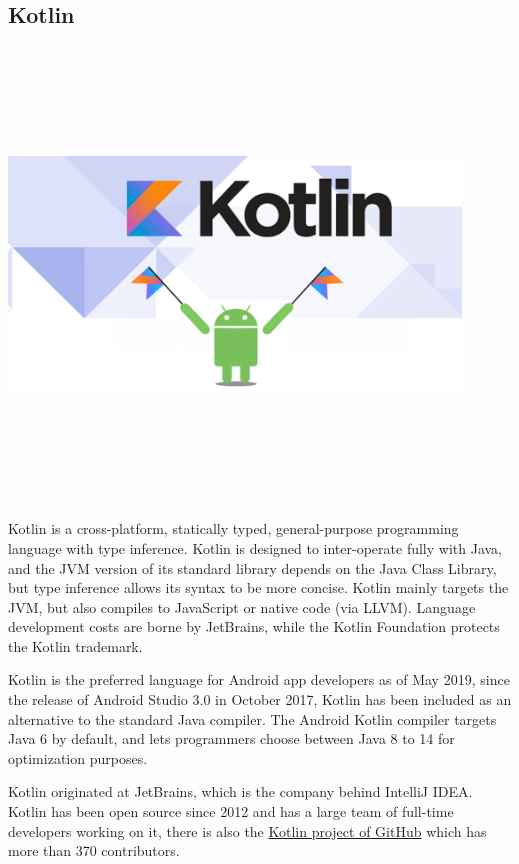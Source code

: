\subsection{Kotlin}
\par
\medskip
\begin{center}
    \includegraphics[width=12cm,height=12cm,keepaspectratio]{Images/Kotlin.png}
\end{center}
Kotlin is a cross-platform, statically typed, general-purpose programming language with type inference. Kotlin is designed to inter-operate fully with Java, and the JVM version of its standard library depends on the Java Class Library, but type inference allows its syntax to be more concise. Kotlin mainly targets the JVM, but also compiles to JavaScript or native code (via LLVM). Language development costs are borne by JetBrains, while the Kotlin Foundation protects the Kotlin trademark.

Kotlin is the preferred language for Android app developers as of May 2019, since the release of Android Studio 3.0 in October 2017, Kotlin has been included as an alternative to the standard Java compiler. The Android Kotlin compiler targets Java 6 by default, and lets programmers choose between Java 8 to 14 for optimization purposes.

Kotlin originated at JetBrains, which is the company behind IntelliJ IDEA. Kotlin has been open source since 2012 and has a large team of full-time developers working on it, there is also the \hyperlink{https://github.com/JetBrains/kotlin}{Kotlin project of GitHub} which has more than 370 contributors.

